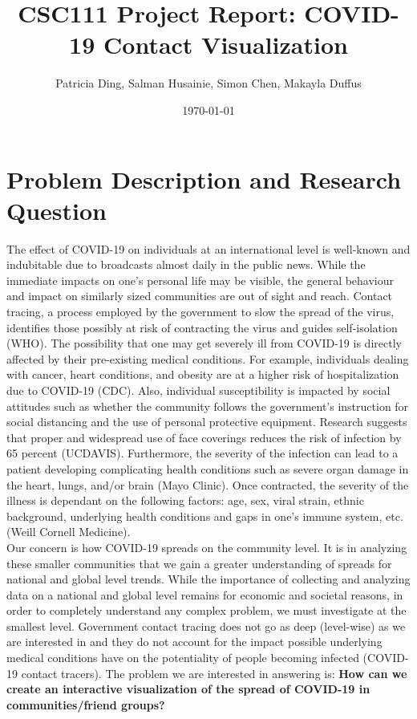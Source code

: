 \documentclass[fontsize=11pt]{article}
\title{CSC111 Project Report: COVID-19 Contact Visualization}
\author{Patricia Ding, Salman Husainie, Simon Chen, Makayla Duffus}
\date{\today}
\begin{document}
    \maketitle

    \section*{Problem Description and Research Question}
    The effect of COVID-19 on individuals at an international level is well-known and indubitable due to broadcasts almost daily in the public news. While the immediate impacts on one's personal life may be visible, the general behaviour and impact on similarly sized communities are out of sight and reach. Contact tracing, a process employed by the government to slow the spread of the virus, identifies those possibly at risk of contracting the virus and guides self-isolation (WHO). The possibility that one may get severely ill from COVID-19 is directly affected by their pre-existing medical conditions. For example, individuals dealing with cancer, heart conditions, and obesity are at a higher risk of hospitalization due to COVID-19 (CDC). Also, individual susceptibility is impacted by social attitudes such as whether the community follows the government's instruction for social distancing and the use of personal protective equipment. Research suggests that proper and widespread use of face coverings reduces the risk of infection by 65 percent (UCDAVIS). Furthermore, the severity of the infection can lead to a patient developing complicating health conditions such as severe organ damage in the heart, lungs, and/or brain (Mayo Clinic). Once contracted, the severity of the illness is dependant on the following factors: age, sex, viral strain, ethnic background, underlying health conditions and gaps in one's immune system, etc. (Weill Cornell Medicine).\\
    \newline
    \noindent
    Our concern is how COVID-19 spreads on the community level. It is in analyzing these smaller communities that we gain a greater understanding of spreads for national and global level trends. While the importance of collecting and analyzing data on a national and global level remains for economic and societal reasons, in order to completely understand any complex problem, we must investigate at the smallest level. Government contact tracing does not go as deep (level-wise) as we are interested in and they do not account for the impact possible underlying medical conditions have on the potentiality of people becoming infected (COVID-19 contact tracers). The problem we are interested in answering is: \textbf{How can we create an interactive visualization of the spread of COVID-19 in communities/friend groups?}
    \newpage
%
\end{document}
